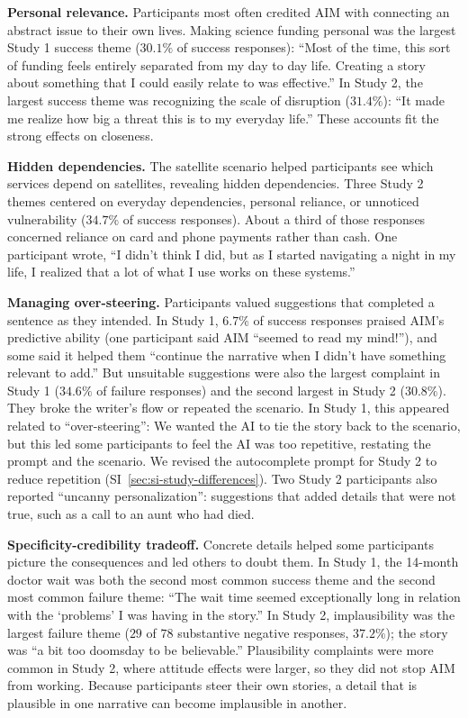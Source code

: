 \documentclass[11pt]{article}
\begin{document}
\textbf{Personal relevance.} Participants most often credited AIM with connecting an abstract issue to their own lives. Making science funding personal was the largest Study 1 success theme ($30.1\%$ of success responses): ``Most of the time, this sort of funding feels entirely separated from my day to day life. Creating a story about something that I could easily relate to was effective.'' In Study 2, the largest success theme was recognizing the scale of disruption ($31.4\%$): ``It made me realize how big a threat this is to my everyday life.'' These accounts fit the strong effects on closeness.

\textbf{Hidden dependencies.} The satellite scenario helped participants see which services depend on satellites, revealing hidden dependencies. Three Study 2 themes centered on everyday dependencies, personal reliance, or unnoticed vulnerability ($34.7\%$ of success responses). About a third of those responses concerned reliance on card and phone payments rather than cash. One participant wrote, ``I didn't think I did, but as I started navigating a night in my life, I realized that a lot of what I use works on these systems.''

\textbf{Managing over-steering.} Participants valued suggestions that completed a sentence as they intended. In Study 1, $6.7\%$ of success responses praised AIM's predictive ability (one participant said AIM ``seemed to read my mind!''), and some said it helped them ``continue the narrative when I didn't have something relevant to add.'' But unsuitable suggestions were also the largest complaint in Study 1 ($34.6\%$ of failure responses) and the second largest in Study 2 ($30.8\%$). They broke the writer's flow or repeated the scenario.  In Study 1, this appeared related to ``over-steering'': We wanted the AI to tie the story back to the scenario, but this led some participants to feel the AI was too repetitive, restating the prompt and the scenario. We revised the autocomplete prompt for Study 2 to reduce repetition (SI~\autoref{sec:si-study-differences}). Two Study 2 participants also reported ``uncanny personalization'': suggestions that added details that were not true, such as a call to an aunt who had died.

\textbf{Specificity-credibility tradeoff.} Concrete details helped some participants picture the consequences and led others to doubt them. In Study 1, the 14-month doctor wait was both the second most common success theme and the second most common failure theme: ``The wait time seemed exceptionally long in relation with the `problems' I was having in the story.'' In Study 2, implausibility was the largest failure theme ($29$ of $78$ substantive negative responses, $37.2\%$); the story was ``a bit too doomsday to be believable.'' Plausibility complaints were more common in Study 2, where attitude effects were larger, so they did not stop AIM from working. Because participants steer their own stories, a detail that is plausible in one narrative can become implausible in another.
\end{document}

